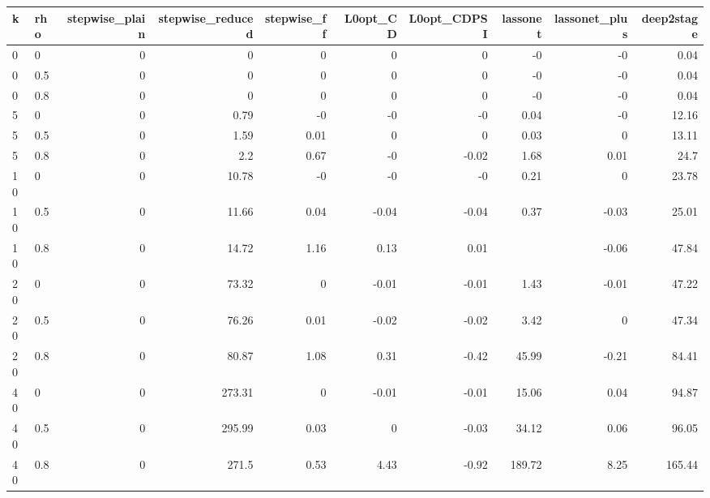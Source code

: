 \begin{tabular}{llrrrrrrrr}
\toprule
k & rho & stepwise\_plain & stepwise\_reduced & stepwise\_ff & L0opt\_CD & L0opt\_CDPSI & lassonet & lassonet\_plus & deep2stage \\
\midrule
0 & 0 & 0 & 0 & 0 & 0 & 0 & -0 & -0 & 0.04 \\
0 & 0.5 & 0 & 0 & 0 & 0 & 0 & -0 & -0 & 0.04 \\
0 & 0.8 & 0 & 0 & 0 & 0 & 0 & -0 & -0 & 0.04 \\
5 & 0 & 0 & 0.79 & -0 & -0 & -0 & 0.04 & -0 & 12.16 \\
5 & 0.5 & 0 & 1.59 & 0.01 & 0 & 0 & 0.03 & 0 & 13.11 \\
5 & 0.8 & 0 & 2.2 & 0.67 & -0 & -0.02 & 1.68 & 0.01 & 24.7 \\
10 & 0 & 0 & 10.78 & -0 & -0 & -0 & 0.21 & 0 & 23.78 \\
10 & 0.5 & 0 & 11.66 & 0.04 & -0.04 & -0.04 & 0.37 & -0.03 & 25.01 \\
10 & 0.8 & 0 & 14.72 & 1.16 & 0.13 & 0.01 &  & -0.06 & 47.84 \\
20 & 0 & 0 & 73.32 & 0 & -0.01 & -0.01 & 1.43 & -0.01 & 47.22 \\
20 & 0.5 & 0 & 76.26 & 0.01 & -0.02 & -0.02 & 3.42 & 0 & 47.34 \\
20 & 0.8 & 0 & 80.87 & 1.08 & 0.31 & -0.42 & 45.99 & -0.21 & 84.41 \\
40 & 0 & 0 & 273.31 & 0 & -0.01 & -0.01 & 15.06 & 0.04 & 94.87 \\
40 & 0.5 & 0 & 295.99 & 0.03 & 0 & -0.03 & 34.12 & 0.06 & 96.05 \\
40 & 0.8 & 0 & 271.5 & 0.53 & 4.43 & -0.92 & 189.72 & 8.25 & 165.44 \\
\bottomrule
\end{tabular}
